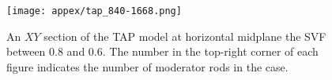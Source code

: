 \newpage
\begin{figure}[htp!] %
	\centering
	\texttt{[image: appex/tap\_840-1668.png]}
			\vspace{-3mm}
	\caption{An $XY$ section of the \gls{TAP} model at horizontal midplane the 
	\gls{SVF} between 0.8 and 0.6. The number in the top-right corner of 
	each figure indicates the number of moderator rods in the case.}
	\label{fig:tap-840-1668}
\end{figure}

